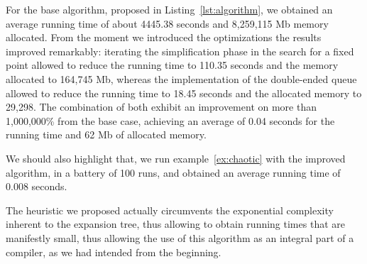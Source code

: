 For the base algorithm, proposed in Listing~\ref{lst:algorithm}, we
obtained an average running time of about 4445.38 seconds and
8,259,115 Mb memory allocated. From the moment we introduced the
optimizations the results improved remarkably: iterating the
simplification phase in the search for a fixed point allowed to reduce
the running time to 110.35 seconds and the memory allocated to 164,745
Mb, whereas the implementation of the double-ended queue allowed to
reduce the running time to 18.45 seconds and the allocated memory to
29,298. The combination of both exhibit an improvement on more than
1,000,000\% from the base case, achieving an average of 0.04
seconds for the running time and 62 Mb of allocated memory.

We should also highlight that, we run example~\eqref{ex:chaotic}
with the improved algorithm, in a battery of 100 runs, and obtained an
average running time of 0.008 seconds.

The heuristic we proposed actually circumvents the exponential complexity 
inherent to the expansion tree, thus allowing to obtain running times that 
are manifestly small, thus allowing the use of this algorithm as an integral 
part of a compiler, as we had intended from the beginning.

